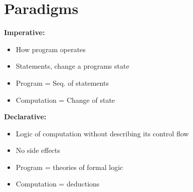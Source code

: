 
\section{Paradigms}

\begin{breakbox}
\textbf{Imperative:}
\begin{itemize}
	\item How program operates
	\item Statements, change a programs state
	\item Program = Seq. of statements
	\item Computation = Change of state
\end{itemize}
\textbf{Declarative:}
\begin{itemize}
	\item Logic of computation without describing its control flow
	\item No side effects
	\item Program = theories of formal logic
	\item Computation = deductions
\end{itemize}
\end{breakbox}

